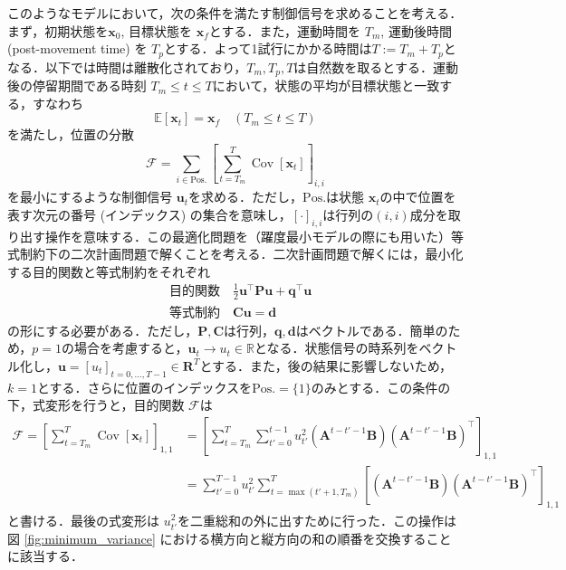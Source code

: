 \documentclass[titlepage]{ltjsbook}
\begin{document}
このようなモデルにおいて，次の条件を満たす制御信号を求めることを考える．まず，初期状態を$\mathbf{x}_0$, 目標状態を $\mathbf{x}_f$とする．また，運動時間を $T_m$, 運動後時間 (post-movement time) を $T_p$とする．よって1試行にかかる時間は$T:=T_m + T_p$となる．以下では時間は離散化されており，$T_m, T_p, T$は自然数を取るとする．運動後の停留期間である時刻 $T_m\leq t \leq T$において，状態の平均が目標状態と一致する，すなわち
\begin{equation}
\mathbb{E}\left[\mathbf{x}_{t}\right] = \mathbf{x}_f\quad (T_m\leq t \leq T)
\end{equation}
を満たし，位置の分散
\begin{equation}
\mathcal{F}=\sum_{i\in \mathrm{Pos.}}\left[\sum_{t=T_m}^{T} \operatorname{Cov}\left[\mathbf{x}_{t}\right]\right]_{i, i}
\end{equation}
を最小にするような制御信号 $\mathbf{u}_t$を求める．ただし，$\mathrm{Pos.}$は状態 $\mathbf{x}_t$の中で位置を表す次元の番号 (インデックス) の集合を意味し，$[\cdot]_{i,i}$は行列の$(i,i)$成分を取り出す操作を意味する．この最適化問題を（躍度最小モデルの際にも用いた）等式制約下の二次計画問題で解くことを考える．二次計画問題で解くには，最小化する目的関数と等式制約をそれぞれ
\begin{align}
&{\text{目的関数}}\quad {\frac {1}{2}}\mathbf{u}^\top \mathbf{P}\mathbf{u} +\mathbf{q} ^{\top}\mathbf{u}\\
&{\text{等式制約}}\quad \mathbf{C}\mathbf{u} =\mathbf{d}
\end{align}
の形にする必要がある．ただし，$\mathbf{P}, \mathbf{C}$は行列，$\mathbf{q}, \mathbf{d}$はベクトルである．簡単のため，$p=1$の場合を考慮すると，$\mathbf{u}_t \to u_{t} \in \mathbb{R}$となる．状態信号の時系列をベクトル化し，$\mathbf{u}=[u_t]_{t=0, \ldots, T-1} \in \mathbf{R}^{T}$とする．また，後の結果に影響しないため，$k=1$とする．さらに位置のインデックスを$\mathrm{Pos.}=\{1\}$のみとする．この条件の下，式変形を行うと，目的関数 $\mathcal{F}$は
\begin{align}
\mathcal{F}=\left[\sum_{t=T_m}^{T} \operatorname{Cov}\left[\mathbf{x}_{t}\right]\right]_{1,1}
&=\left[\sum_{t=T_m}^{T}\sum_{t'=0}^{t-1}u_{t'}^2\left(\mathbf{A}^{t-t'-1} \mathbf{B}\right) \left(\mathbf{A}^{t-t'-1} \mathbf{B}\right)^{\top}\right]_{1,1}\\
&=\sum_{t'=0}^{T-1} u_{t'}^2 \sum_{t=\max(t'+1, T_m)}^{T} \left[\left(\mathbf{A}^{t-t'-1} \mathbf{B}\right)\left(\mathbf{A}^{t-t'-1} \mathbf{B}\right)^{\top} \right]_{1,1} \label{eq:mim_var_f}
\end{align}
と書ける．最後の式変形は $u_{t'}^2$を二重総和の外に出すために行った．この操作は図 \ref{fig:minimum_variance} における横方向と縦方向の和の順番を交換することに該当する．
\end{document}
